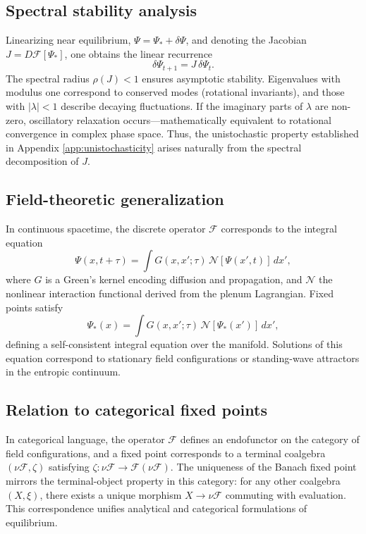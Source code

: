 \documentclass[12pt,a4paper]{article}
\theoremstyle{plain}
\begin{document}
\subsection{Spectral stability analysis}
Linearizing near equilibrium,
\(\Psi=\Psi_*+\delta\Psi\),
and denoting the Jacobian \(J=D\mathcal{F}[\Psi_*]\),
one obtains the linear recurrence
\[
\delta\Psi_{t+1}=J\,\delta\Psi_t.
\]
The spectral radius \(\rho(J)<1\) ensures asymptotic stability.
Eigenvalues with modulus one correspond to conserved modes (rotational invariants), 
and those with \(|\lambda|<1\) describe decaying fluctuations.
If the imaginary parts of \(\lambda\) are non-zero,
oscillatory relaxation occurs—mathematically equivalent to rotational convergence in complex phase space.
Thus, the unistochastic property established in Appendix \ref{app:unistochasticity} arises naturally from the spectral decomposition of \(J\).

\subsection{Field-theoretic generalization}
In continuous spacetime,
the discrete operator \(\mathcal{F}\) corresponds to the integral equation
\begin{equation}
\Psi(x,t+\tau)
 = \int G(x,x';\tau)\, \mathcal{N}[\Psi(x',t)]\,dx',
\end{equation}
where \(G\) is a Green’s kernel encoding diffusion and propagation,
and \(\mathcal{N}\) the nonlinear interaction functional derived from the plenum Lagrangian.
Fixed points satisfy
\[
\Psi_*(x) = \int G(x,x';\tau)\, \mathcal{N}[\Psi_*(x')]\,dx',
\]
defining a self-consistent integral equation over the manifold.
Solutions of this equation correspond to stationary field configurations or standing-wave attractors in the entropic continuum.

\subsection{Relation to categorical fixed points}
In categorical language, the operator \(\mathcal{F}\) defines an endofunctor on the category of field configurations,
and a fixed point corresponds to a terminal coalgebra
\((\nu\mathcal{F},\zeta)\)
satisfying \(\zeta:\nu\mathcal{F}\to\mathcal{F}(\nu\mathcal{F})\).
The uniqueness of the Banach fixed point mirrors the terminal-object property in this category:
for any other coalgebra \((X,\xi)\),
there exists a unique morphism \(X\to\nu\mathcal{F}\)
commuting with evaluation.
This correspondence unifies analytical and categorical formulations of equilibrium.
\end{document}
